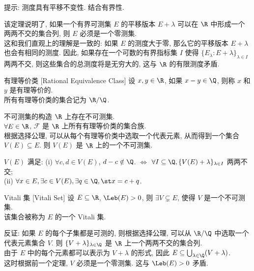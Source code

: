 \begin{prf}
    提示: 测度具有平移不变性. 结合有界性.
\end{prf}
\begin{rmk}
    [Dedicatia]
    该定理说明了, 如果一个有界可测集 \(E\) 的平移版本 \(E+\lambda\) 可以在 \(\R\) 中形成一个两两不交的集合列, 则 \(E\) 必须是一个零测集.\\
    这和我们直观上的理解是一致的: 如果 \(E\) 的测度大于零, 那么它的平移版本 \(E+\lambda\) 也会有相同的测度. 因此, 如果存在一个可数的有界指标集 \(I\) 使得 \(\{E_\lambda:E+\lambda\}_{\lambda\in I}\) 两两不交, 则这些集合的总测度将是无穷大的, 这与 \(\R\) 的有限测度矛盾.
\end{rmk}
\begin{dfn}
    {有理等价类}
    [Rational Equivalence Class]
    设 \(x,y\in\R\), 如果 \(x-y\in\Q\), 则称 \(x\) 和 \(y\) 是有理等价的. \\
    所有有理等价类的集合记为 \(\R/\Q\).
\end{dfn}
\begin{thm}
    {不可测集的构造}
    \(\R\) 上存在不可测集.\\
    \(\forall E\in\R\), \(\mathscr{F}\) 是 \(\R\) 上所有有理等价类的集合族.\\
    根据选择公理, 可以从每个有理等价类中选取一个代表元素, 从而得到一个集合 \(V(E)\subseteq E\). 则 \(V(E)\) 是 \(\R\) 上的一个不可测集.
\end{thm}
\begin{prf}
    \(V(E)\) 满足: (i) \(\forall c,d\in V(E)\), \(d-c\notin\Q\). \(\Longleftrightarrow\) \(\forall I\subseteq\Q, \{V(E)+\lambda\}_{\lambda\in I}\) 两两不交;\\
    (ii) \(\forall x\in E, \exists c\in V(E), \exists q\in\Q, \st x=c+q\). 
\end{prf}
\begin{thm}
    {Vitali 集}
    [Vitali Set]
    设 \(E\subseteq\R\), \(\Leb(E)>0\), 则 \(\exists V\subsetneq E\), 使得 \(V\) 是一个不可测集. \\
    该集合被称为 \(E\) 的一个 Vitali 集.
\end{thm}
\begin{prf}
    反证: 如果 \(E\) 的每个子集都是可测的, 则根据选择公理, 可以从 \(\R/\Q\) 中选取一个代表元素集合 \(V\). 则 \(\{V+\lambda\}_{\lambda\in\Q}\) 是 \(\R\) 上一个两两不交的集合列. \\
    由于 \(E\) 中的每个元素都可以表示为 \(V+\lambda\) 的形式, 因此 \(E \subseteq \bigcup_{\lambda\in\Q} (V+\lambda)\). \\
    这时根据前一个定理, \(V\) 必须是一个零测集. 这与 \(\Leb(E)>0\) 矛盾.
\end{prf}
